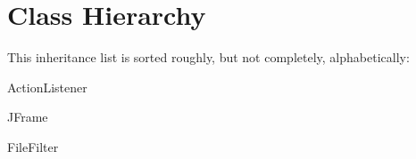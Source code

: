 \section{Class Hierarchy}
This inheritance list is sorted roughly, but not completely, alphabetically\+:\begin{DoxyCompactList}
\item Action\+Listener\begin{DoxyCompactList}
\item {}
\end{DoxyCompactList}
\item {}
\item J\+Frame\begin{DoxyCompactList}
\item {}
\end{DoxyCompactList}
\item {}
\item {}
\item {}
\item File\+Filter\begin{DoxyCompactList}
\item {}
\end{DoxyCompactList}
\end{DoxyCompactList}
